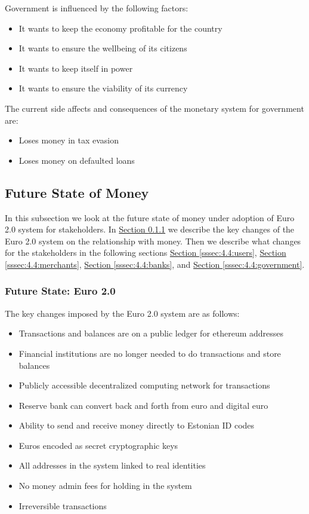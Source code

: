 \documentclass[12pt]{article} %
\newcommand{\hypersectionref}[1]{\hyperref[#1]{Section \ref{#1}}}
\begin{document}
{Government is influenced by the following factors:

\begin{itemize}
	\item It wants to keep the economy profitable for the country
	\item It wants to ensure the wellbeing of its citizens
	\item It wants to keep itself in power
	\item It wants to ensure the viability of its currency
\end{itemize}

The current side affects and consequences of the monetary system for government are:

\begin{itemize}
	\item Loses money in tax evasion
	\item Loses money on defaulted loans
\end{itemize}

\subsection{Future State of Money} \label{ssec:4.4}

In this subsection we look at the future state of money under adoption of Euro 2.0 system for stakeholders. In \hypersectionref{sssec:4.4:euro2} we describe the key changes of the Euro 2.0 system on the relationship with money. Then we describe what changes for the stakeholders in the following sections \hypersectionref{sssec:4.4:users}, \hypersectionref{sssec:4.4:merchants}, \hypersectionref{sssec:4.4:banks}, and \hypersectionref{sssec:4.4:government}.

\subsubsection{Future State: Euro 2.0} \label{sssec:4.4:euro2}

The key changes imposed by the Euro 2.0 system are as follows:

\begin{itemize}
	\item Transactions and balances are on a public ledger for ethereum addresses
	\item Financial institutions are no longer needed to do transactions and store balances
	\item Publicly accessible decentralized computing network for transactions
	\item Reserve bank can convert back and forth from euro and digital euro
	\item Ability to send and receive money directly to Estonian ID codes
	\item Euros encoded as secret cryptographic keys
	\item All addresses in the system linked to real identities
	\item No money admin fees for holding in the system
	\item Irreversible transactions
\end{itemize}

}
\end{document}
